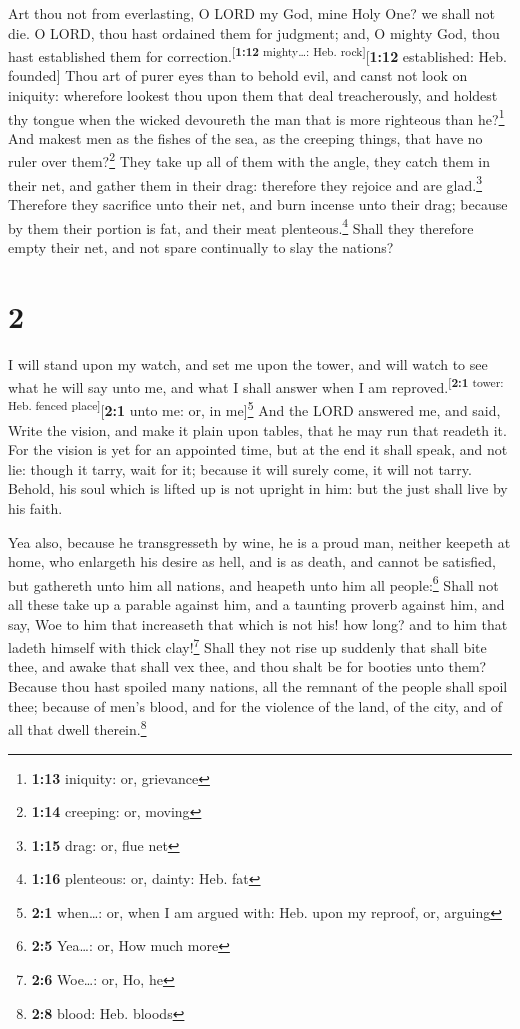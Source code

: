  Art thou not from everlasting, O LORD my God, mine Holy
One? we shall not die. O LORD, thou hast ordained them for judgment;
and, O mighty God, thou hast established them for
correction.\textsuperscript{{[}\textbf{1:12} mighty\ldots: Heb.
rock{]}}{[}\textbf{1:12} established: Heb. founded{]} 
Thou art of purer eyes than to behold evil, and canst not look on
iniquity: wherefore lookest thou upon them that deal treacherously, and
holdest thy tongue when the wicked devoureth the man that is more
righteous than he?\footnote{\textbf{1:13} iniquity: or, grievance}
 And makest men as the fishes of the sea, as the creeping
things, that have no ruler over them?\footnote{\textbf{1:14} creeping:
  or, moving}  They take up all of them with the angle,
they catch them in their net, and gather them in their drag: therefore
they rejoice and are glad.\footnote{\textbf{1:15} drag: or, flue net}
 Therefore they sacrifice unto their net, and burn
incense unto their drag; because by them their portion is fat, and their
meat plenteous.\footnote{\textbf{1:16} plenteous: or, dainty: Heb. fat}
 Shall they therefore empty their net, and not spare
continually to slay the nations?

\hypertarget{section-1}{%
\section{2}\label{section-1}}

 I will stand upon my watch, and set me upon the tower,
and will watch to see what he will say unto me, and what I shall answer
when I am reproved.\textsuperscript{{[}\textbf{2:1} tower: Heb. fenced
place{]}}{[}\textbf{2:1} unto me: or, in me{]}\footnote{\textbf{2:1}
  when\ldots: or, when I am argued with: Heb. upon my reproof, or,
  arguing}  And the LORD answered me, and said, Write the
vision, and make it plain upon tables, that he may run that readeth it.
 For the vision is yet for an appointed time, but at the
end it shall speak, and not lie: though it tarry, wait for it; because
it will surely come, it will not tarry.  Behold, his soul
which is lifted up is not upright in him: but the just shall live by his
faith.

 Yea also, because he transgresseth by wine, he is a proud
man, neither keepeth at home, who enlargeth his desire as hell, and is
as death, and cannot be satisfied, but gathereth unto him all nations,
and heapeth unto him all people:\footnote{\textbf{2:5} Yea\ldots: or,
  How much more}  Shall not all these take up a parable
against him, and a taunting proverb against him, and say, Woe to him
that increaseth that which is not his! how long? and to him that ladeth
himself with thick clay!\footnote{\textbf{2:6} Woe\ldots: or, Ho, he}
 Shall they not rise up suddenly that shall bite thee, and
awake that shall vex thee, and thou shalt be for booties unto them?
 Because thou hast spoiled many nations, all the remnant
of the people shall spoil thee; because of men's blood, and for the
violence of the land, of the city, and of all that dwell
therein.\footnote{\textbf{2:8} blood: Heb. bloods}

